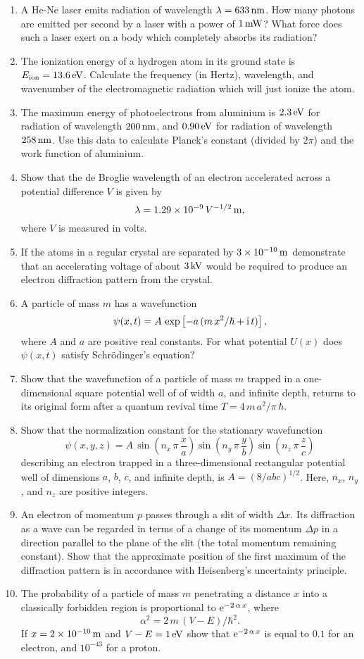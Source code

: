 {\begin{enumerate}
\item A He-Ne laser emits radiation of wavelength $\lambda =633\,{\rm nm}$. How many photons are emitted per second
by a laser with a power of $1\,{\rm mW}$? What force does such a laser exert on a body which completely absorbs
its radiation?
\item The ionization energy of a hydrogen atom in its ground state is $E_{\rm ion}= 13.6\,{\rm eV}$. Calculate the
frequency (in Hertz), wavelength, and wavenumber of the electromagnetic radiation which will just ionize the atom.
\item The maximum energy of photoelectrons from aluminium is $2.3\,{\rm eV}$ for radiation of wavelength $200\,{\rm nm}$,
and $0.90\,{\rm eV}$ for radiation of wavelength $258\,{\rm nm}$. Use this data to calculate Planck's
constant (divided by $2\pi$) and the work function of aluminium.
\item Show that the de Broglie wavelength of an electron accelerated across a potential difference $V$
is given by
$$
\lambda = 1.29\times 10^{-9}\,V^{-1/2}\,{\rm m},
$$
where $V$ is measured in volts.
\item If the atoms in a regular crystal are separated by $3\times 10^{-10}\,{\rm m}$ demonstrate that an accelerating
voltage of about $3\,{\rm kV}$  would be required to produce an electron diffraction pattern from the crystal. 
\item A particle of mass $m$ has a wavefunction
$$
\psi(x,t)= A\,\exp\left[-a\,(m\,x^2/\hbar+ {\rm i}\,t)\right],
$$
where $A$ and $a$ are positive real constants. For what potential $U(x)$ does $\psi(x,t)$ satisfy
Schr\"{o}dinger's equation?
\item Show that the wavefunction of a particle of mass $m$ trapped in a  one-dimensio\-nal square potential well of 
of width $a$, and infinite depth, returns to its original form after a quantum revival time $T=4\,m\,a^2/\pi\,\hbar$. 
\item Show that the normalization constant for the stationary wavefunction
$$
\psi(x,y,z) = A\,\sin\left(n_x\,\pi\,\frac{x}{a}\right)\sin\left(n_y\,\pi\,\frac{y}{b}\right)\sin\left(n_z\,\pi\,\frac{z}{c}\right)
$$
describing an electron trapped in a three-dimensional rectangular potential well of dimensions $a$, $b$, $c$, and
infinite depth, is $A=(8/abc)^{1/2}$. Here, $n_x$, $n_y$, and
$n_z$ are positive integers. 
\item An electron of momentum $p$ passes through a slit of width $\Delta x$. Its diffraction as a wave can
be regarded in terms of a change of its momentum $\Delta p$ in a direction parallel to the plane of the
slit (the total momentum remaining constant). Show that the approximate position of the first maximum
of the diffraction pattern is in accordance with Heisenberg's uncertainty principle. 
\item The probability of a particle of mass $m$ penetrating a distance $x$ into a classically
forbidden region is proportional to ${\rm e}^{-2\,\alpha\,x}$, where
$$
\alpha^2 = 2\,m\,(V-E)/\hbar^2.
$$
If $x=2\times 10^{-10}\,{\rm m}$ and $V-E = 1\,{\rm eV}$ show that ${\rm e}^{-2\,\alpha\,x}$ is equal to $0.1$
for an electron, and $10^{-43}$ for a proton.
\end{enumerate}
}
